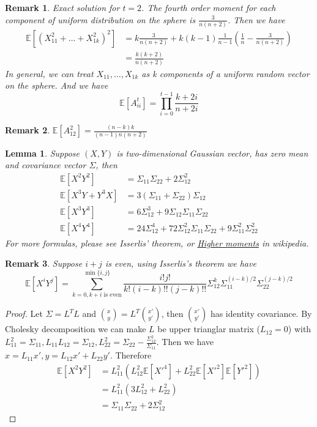 \documentclass{article}
\def\E{\mathbb{E}}
\newtheorem{lemma}{Lemma}
\newtheorem{remark}{Remark}
\begin{document}
\begin{remark}
Exact solution for $t=2$. The fourth order moment for each component of
uniform distribution on the sphere is $\frac{3}{n(n+2)}$. Then we have
\begin{align*}
\E[(X_{11}^2 + \dots + X_{1k}^2)^2] &=
k\frac{3}{n(n+2)} + k(k-1)\frac{1}{n-1} (\frac{1}{n} - \frac{3}{n(n+2)}) \\
&=\frac{k(k+2)}{n(n+2)}
\end{align*}
In general, we can treat $X_{11}, \dots, X_{1k}$
as k components of a uniform random vector on the sphere. And we have
\begin{equation}
\E[A_{ii}^t] = \prod_{i=0}^{t-1}\frac{k+2i}{n+2i}
\end{equation}
\end{remark}
\begin{remark}
$\E[A_{12}^2] = \frac{(n-k)k}{(n-1)n(n+2)}$
\end{remark}
\begin{lemma}\label{lem:x2y2}
Suppose $(X,Y)$ is two-dimensional Gaussian vector,
has zero mean and covariance vector $\Sigma$, then
\begin{align*}
\E[X^2 Y^2] &= \Sigma_{11}\Sigma_{22} + 2\Sigma_{12}^2 \\
\E[X^3 Y + Y^3 X ] &= 3 (\Sigma_{11} + \Sigma_{22}) \Sigma_{12} \\
\E[X^3 Y^3] & = 6 \Sigma_{12}^3 + 9 \Sigma_{12} \Sigma_{11} \Sigma_{22}\\
\E[X^4 Y^4] & = 24 \Sigma_{12}^4 +
72 \Sigma_{12}^2 \Sigma_{11} \Sigma_{22} + 9\Sigma_{11}^2 \Sigma_{22}^2
\end{align*}
For more formulas, please see Isserlis' theorem, or
\href{https://en.wikipedia.org/wiki/
Multivariate_normal_distribution#Higher_moments}{Higher moments}
in wikipedia.
\end{lemma}
\begin{remark}
Suppose $ i + j $ is even, using Isserlis's theorem we have
\begin{equation}\label{eq:Isserlis}
\E[X^i Y^j] =
\sum_{k=0, k+i \textrm{ is even}}^{\min\{i,j\}}
\frac{i! j!}{k! (i-k)!!(j-k)!!}
\Sigma_{12}^k \Sigma_{11}^{(i-k)/2}\Sigma_{22}^{(j-k)/2}
\end{equation}
\end{remark}
\begin{proof}
Let $\Sigma = L^T L $ and $\binom{x}{y} = L^T \binom{x'}{y'}$,
then $\binom{x'}{y'}$ has identity covariance.
By Cholesky decomposition we can make $L$ be upper trianglar matrix
($L_{12}=0$) with $L_{11}^2 = \Sigma_{11},
L_{11}L_{12} = \Sigma_{12},
L_{22}^2 = \Sigma_{22} - \frac{\Sigma_{12}^2}{\Sigma_{11}}$.
Then we have $x = L_{11} x', y = L_{12} x' + L_{22} y'$. Therefore
\begin{align*}
\E[X^2 Y^2] & = L_{11}^2 (L_{12}^2\E[X'^4]+ L^2_{22}\E[X'^2]\E[Y'^2]) \\
& = L_{11}^2(3L_{12}^2 + L^2_{22}) \\
& = \Sigma_{11}\Sigma_{22} + 2\Sigma_{12}^2
\end{align*}
\end{proof}
\end{document}
